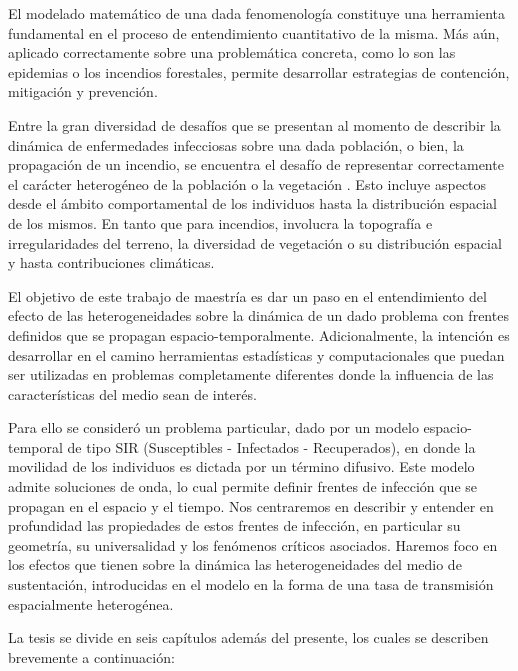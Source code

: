 
El modelado matemático de una dada fenomenología constituye una herramienta fundamental en el proceso de entendimiento cuantitativo de la misma. Más aún, aplicado 
correctamente sobre una problemática concreta, como lo son las epidemias o los incendios forestales, permite desarrollar estrategias de contención, mitigación y 
prevención.

Entre la gran diversidad de desafíos que se presentan al momento de describir la dinámica de enfermedades infecciosas sobre una dada población, o bien, la propagación de un incendio, se encuentra el desafío de representar correctamente el carácter heterogéneo de la población o la vegetación \cite{RILEY201568}. Esto incluye aspectos desde el ámbito comportamental de los individuos hasta la distribución espacial de los mismos. En tanto que para incendios, involucra la topografía e irregularidades del terreno, la diversidad de vegetación o su distribución espacial y hasta contribuciones climáticas. 

El objetivo de este trabajo de maestría es dar un paso en el entendimiento del efecto de las heterogeneidades sobre la dinámica de un dado problema con frentes definidos que se propagan espacio-temporalmente. Adicionalmente, la intención es desarrollar en el camino herramientas estadísticas y computacionales que puedan ser utilizadas en problemas completamente diferentes donde la influencia de las características del medio sean de interés.

Para ello se consideró un problema particular, dado por un modelo espacio-temporal de tipo SIR 
(Susceptibles - Infectados - Recuperados), en donde la movilidad de los individuos es dictada por un término difusivo. Este modelo admite soluciones de onda,
lo cual permite definir frentes de infección que se propagan en el espacio y el tiempo. Nos centraremos en describir y entender en profundidad las propiedades de estos frentes de infección, en particular su geometría, su universalidad y los fenómenos críticos asociados. Haremos foco en los efectos que tienen sobre la dinámica las heterogeneidades del medio de sustentación, introducidas en el modelo en la forma de una tasa de transmisión espacialmente heterogénea.

La tesis se divide en seis capítulos además del presente, los cuales se describen brevemente a continuación:


